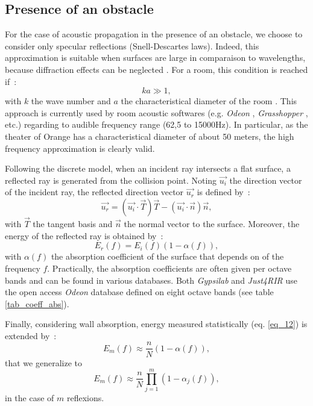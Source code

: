 \documentclass{aes2e}
\begin{document}
\subsection{Presence of an obstacle}
For the case of acoustic propagation in the presence of an obstacle, we choose to consider only specular reflections (Snell-Descartes laws). Indeed, this approximation is suitable when surfaces are large in comparaison to wavelengths, because diffraction effects can be neglected \cite{jouhaneau}. For a room, this condition is reached if~:
\begin{equation}
ka \gg 1, 
\end{equation}
with $k$ the wave number and $a$ the characteristical diameter of the room \cite{hautes_freq}. This approach is currently used by room acoustic softwares (e.g. \textit{Odeon} \cite{odeon}, \textit{Grasshopper} \cite{grasshopper}, etc.) regarding to audible frequency range (62,5 to 15000Hz). In particular, as the theater of Orange has a characteristical diameter of about 50 meters, the high frequency approximation is clearly valid. 

Following the discrete model, when an incident ray intersects a flat surface, a reflected ray is generated from the collision point. Noting $\overrightarrow{u_i}$ the direction vector of the incident  ray, the reflected direction vector $\overrightarrow{u_r}$ is defined by~:
\begin{equation}
\label{eq_15}
\overrightarrow{u_r} = (\overrightarrow{u_i} \cdot \overrightarrow{T})\overrightarrow{T} - (\overrightarrow{u_i} \cdot \overrightarrow{n})\overrightarrow{n},
\end{equation}
with $\overrightarrow{T}$ the tangent basis and $\overrightarrow{n}$ the normal vector to the surface. Moreover, the energy of the reflected ray is obtained by~:
\begin{equation}
E_r(f) = E_i(f)(1 - \alpha(f)),
\end{equation}
with $\alpha(f)$  the absorption coefficient of the surface that depends on of the frequency $f$. Practically, the absorption coefficients are often given per octave bands and can be found in various databases. Both \textit{Gypsilab} and \textit{Just4RIR} use the open access \textit{Odeon} database \cite{odeon} defined on eight octave bands (see table \ref{tab_coeff_abs}). 

Finally, considering wall absorption, energy measured statistically (eq. \ref{eq_12}) is extended by~:
\begin{equation}
E_m(f) \approx  \frac{n}{N}(1 - \alpha(f)),
\end{equation}
that we generalize to
\begin{equation}
E_m(f) \approx  \frac{n}{N}\prod_{j=1}^{m}(1 - \alpha_j(f)),
\label{eq_18}
\end{equation}
in the case of $m$ reflexions.
\end{document}
